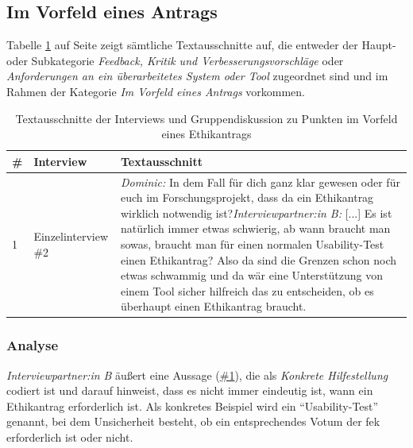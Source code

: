 \documentclass[a4paper,12pt,twoside,numbers=noendperiod]{scrreprt}
\begin{document}
\subsection{Im Vorfeld eines Antrags}
\label{sub-sec:vorfeld-antrag}

Tabelle \ref{tab:anforderungen-vorfeld-antrag} auf Seite \pageref{tab:anforderungen-vorfeld-antrag} zeigt sämtliche Textausschnitte auf, die entweder der Haupt- oder Subkategorie \textit{Feedback, Kritik und Verbesserungsvorschläge} oder \textit{Anforderungen an ein überarbeitetes System oder Tool} zugeordnet sind und im Rahmen der Kategorie \textit{Im Vorfeld eines Antrags} vorkommen.

\begin{table}[ht]
    \centering
    \begin{tabular}{p{.05\linewidth} | p{.2\linewidth} | p{.65\linewidth}}
        \# & \textbf{Interview} & \textbf{Textausschnitt}\\
        \hline
        1 & Einzelinterview \#2 & \textit{Dominic:} In dem Fall für dich ganz klar gewesen oder für euch im Forschungsprojekt, dass da ein Ethikantrag wirklich notwendig ist?\newline \textit{Interviewpartner:in B:} [...] Es ist natürlich immer etwas schwierig, ab wann braucht man sowas, braucht man für einen normalen Usability-Test einen Ethikantrag? Also da sind die Grenzen schon noch etwas schwammig und da wär eine Unterstützung von einem Tool sicher hilfreich das zu entscheiden, ob es überhaupt einen Ethikantrag braucht.
    \end{tabular}
    \caption{Textausschnitte der Interviews und Gruppendiskussion zu Punkten im Vorfeld eines Ethikantrags}
    \label{tab:anforderungen-vorfeld-antrag}
\end{table}

\subsubsection*{Analyse}
\label{sub-sub-sec:analyse-vorfeld-antrag}

\textit{Interviewpartner:in B} äußert eine Aussage (\hyperref[tab:anforderungen-vorfeld-antrag]{\#1}), die als \textit{Konkrete Hilfestellung} codiert ist und darauf hinweist, dass es nicht immer eindeutig ist, wann ein Ethikantrag erforderlich ist. Als konkretes Beispiel wird ein \enquote{Usability-Test} genannt, bei dem Unsicherheit besteht, ob ein entsprechendes Votum der \ac{fek} erforderlich ist oder nicht.
\end{document}
